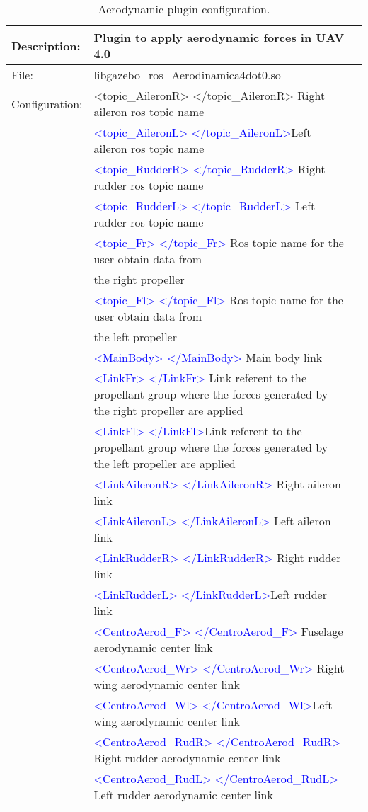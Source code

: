 \begin{table}[h]
	\centering			
	\begin{tabular}{|r|lr|}
		\hline
		\multicolumn{1}{|l|}{Description: } & Plugin to apply aerodynamic forces in UAV 4.0 &        \\
		\hline
		\multicolumn{1}{|l|}{File: } & libgazebo\_ros\_Aerodinamica4dot0.so &        \\
		\hline
		\multicolumn{1}{|l|}{Configuration:} & <topic\_AileronR>  </topic\_AileronR> Right aileron ros topic name  &         \\
		& \textcolor{blue}{<topic\_AileronL> </topic\_AileronL>}Left aileron ros topic name &        \\
		& \textcolor{blue}{<topic\_RudderR> </topic\_RudderR>} Right rudder ros topic name &        \\
		& \textcolor{blue}{<topic\_RudderL> </topic\_RudderL>}  Left rudder ros topic name &        \\
		& \textcolor{blue}{<topic\_Fr> </topic\_Fr>} Ros topic name for the user obtain data from   &         \\
		& the right propeller &         \\
		& \textcolor{blue}{<topic\_Fl> </topic\_Fl>} Ros topic name for the user obtain data from &    	\\
		& the left propeller &		\\	
		& \textcolor{blue}{<MainBody> </MainBody>} Main body link & \\
		& \textcolor{blue}{<LinkFr> </LinkFr>} Link referent to the propellant group where the forces generated by the right propeller are applied &      \\
		& \textcolor{blue}{<LinkFl> </LinkFl>}Link referent to the propellant group where the forces generated by the left propeller are applied &      \\
		& \textcolor{blue}{<LinkAileronR> </LinkAileronR>} Right aileron link &     \\
		& \textcolor{blue}{<LinkAileronL> </LinkAileronL>} Left aileron link &		\\
		& \textcolor{blue}{<LinkRudderR> </LinkRudderR>} Right rudder link &		\\
		& \textcolor{blue}{<LinkRudderL> </LinkRudderL>}Left rudder link &		\\
		& \textcolor{blue}{<CentroAerod\_F> </CentroAerod\_F>} Fuselage aerodynamic center link &		\\
		& \textcolor{blue}{<CentroAerod\_Wr> </CentroAerod\_Wr>} Right wing aerodynamic center link &		\\
		& \textcolor{blue}{<CentroAerod\_Wl> </CentroAerod\_Wl>}Left wing aerodynamic center link &		\\
		& \textcolor{blue}{<CentroAerod\_RudR> </CentroAerod\_RudR>} Right rudder aerodynamic center link &		\\
		& \textcolor{blue}{<CentroAerod\_RudL> </CentroAerod\_RudL>} Left rudder aerodynamic center link &		\\
		\hline
	\end{tabular}%
	\caption{Aerodynamic plugin configuration.}
	\label{tab:Aerodinamicav4}%
\end{table}%




